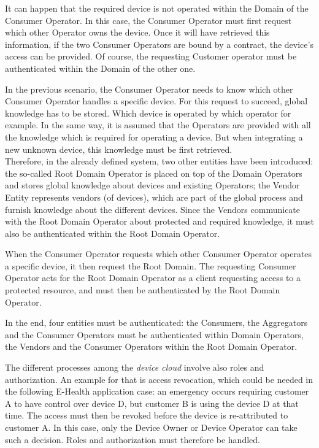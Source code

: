 It can happen that the required device is not operated within the Domain of the Consumer Operator. In this case, the Consumer Operator must first request which other Operator owns the device. Once it will have retrieved this information, if the two Consumer Operators are bound by a contract, the device's access can be provided. Of course, the requesting Customer operator must be authenticated within the Domain of the other one.

In the previous scenario, the Consumer Operator needs to know which other Consumer Operator handles a specific device. For this request to succeed, global knowledge has to be stored. Which device is operated by which operator for example. In the same way, it is assumed that the Operators are provided with all the knowledge which is required for operating a device. But when integrating a new unknown device, this knowledge must be first retrieved. \\Therefore, in the already defined system, two other entities have been introduced: the so-called Root Domain Operator is placed on top of the Domain Operators and stores global knowledge about devices and existing Operators; the Vendor Entity represents vendors (of devices), which are part of the global process and furnish knowledge about the different devices. Since the Vendors communicate with the Root Domain Operator about protected and required knowledge, it must also be authenticated within the Root Domain Operator. 

When the Consumer Operator requests which other Consumer Operator operates a specific device, it then request the Root Domain. The requesting Consumer Operator acts for the Root Domain Operator as a client requesting access to a protected resource, and must then be authenticated by the Root Domain Operator.

In the end, four entities must be authenticated: the Consumers, the Aggregators and the Consumer Operators must be authenticated within Domain Operators, the Vendors and the Consumer Operators within the Root Domain Operator.

The different processes among the \emph{device cloud} involve also roles and authorization. An example for that is access revocation, which could be needed in the following E-Health application case: an emergency occurs requiring customer A to have control over device D, but customer B is using the device D at that time. The access must then be revoked before the device is re-attributed to customer A. In this case, only the Device Owner or Device Operator can take such a decision. Roles and authorization must therefore be handled.

